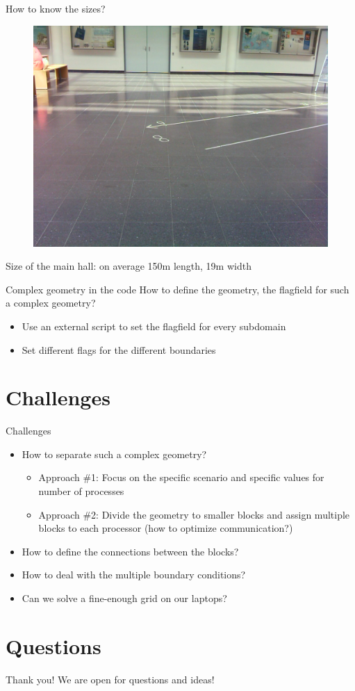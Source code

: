 \documentclass[9pt,pdftex]{beamer}
\begin{document}
\begin{frame}{How to know the sizes?}
  \begin{figure}
 \includegraphics[scale=0.1]{tiles}
\end{figure}
Size of the main hall: on average 150m length, 19m width
\end{frame}

\begin{frame}{Complex geometry in the code}
 How to define the geometry, the flagfield for such a complex geometry?
 \begin{itemize}
  \item Use an external script to set the flagfield for every subdomain
  \item Set different flags for the different boundaries
 \end{itemize}

\end{frame}


\section{Challenges}
\begin{frame}{Challenges}
 \begin{itemize}
  \item How to separate such a complex geometry?
  \begin{itemize}
   \item Approach \#1: Focus on the specific scenario and specific values
   for number of processes
   \item Approach \#2: Divide the geometry to smaller blocks and assign multiple
   blocks to each processor (how to optimize communication?)
  \end{itemize}
 \item How to define the connections between the blocks?
 \item How to deal with the multiple boundary conditions?
 \pause
 \item Can we solve a fine-enough grid on our laptops?
 \end{itemize}

\end{frame}

\section*{Questions}
\begin{frame}{Thank you!}
 We are open for questions and ideas!
\end{frame}
\end{document}
